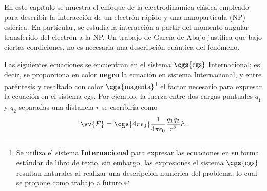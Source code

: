 En este capítulo se muestra el enfoque de la electrodinámica clásica empleado para describir la interacción de un electrón rápido y una nanopartícula (NP) esférica. En partícular, se estudia la interacción a partir del momento angular transferido del electrón a la NP. Un trabajo de García de Abajo \cite{deabajo2021optical} justifica que bajo ciertas condiciones, no es necesaria una descripción cuántica del fenómeno.

Las siguientes ecuaciones se encuentran en el sistema $\cgs{\text{cgs}}$ Internacional; es decir, se proporciona en color \textbf{negro} la ecuación en sistema Internacional, y entre paréntesis y resaltado con color $\cgs{\text{magenta}}$\footnote{Se utiliza el sistema \textbf{Internacional} para expresar las ecuaciones en su forma estándar de libro de texto, sin embargo, las expresiones el sistema $\cgs{\text{cgs}}$ resultan naturales al realizar una descripción numérica del problema, lo cual se propone como trabajo a futuro. } el factor necesario para expresar la ecuación en el sistema cgs. Por ejemplo, la fuerza entre dos cargas puntuales $q_1$ y $q_2$ separadas una distancia $r$ se escribiría como
\begin{equation}
\vv{F} = \cgs{4\pi\epsilon_0}\frac{1}{4\pi\epsilon_0} \frac{q_1 q_2}{r^2} \hat{r}.
\end{equation}
%
%
